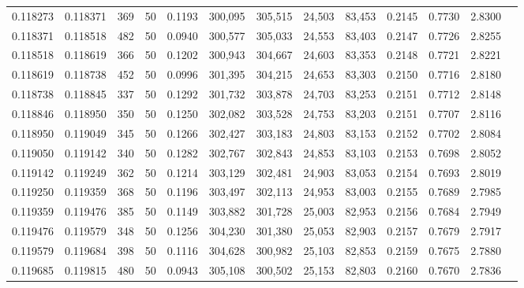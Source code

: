 \begin{tabular}{rrrrrrrrrrrrr}
0.118273 & 0.118371 &   369 &  50 &                                     0.1193 & 300,095 & 305,515 &  24,503 &  83,453 & 0.2145 & 0.7730 & 2.8300 \\
0.118371 & 0.118518 &   482 &  50 &                                     0.0940 & 300,577 & 305,033 &  24,553 &  83,403 & 0.2147 & 0.7726 & 2.8255 \\
0.118518 & 0.118619 &   366 &  50 &                                     0.1202 & 300,943 & 304,667 &  24,603 &  83,353 & 0.2148 & 0.7721 & 2.8221 \\
0.118619 & 0.118738 &   452 &  50 &                                     0.0996 & 301,395 & 304,215 &  24,653 &  83,303 & 0.2150 & 0.7716 & 2.8180 \\
0.118738 & 0.118845 &   337 &  50 &                                     0.1292 & 301,732 & 303,878 &  24,703 &  83,253 & 0.2151 & 0.7712 & 2.8148 \\
0.118846 & 0.118950 &   350 &  50 &                                     0.1250 & 302,082 & 303,528 &  24,753 &  83,203 & 0.2151 & 0.7707 & 2.8116 \\
0.118950 & 0.119049 &   345 &  50 &                                     0.1266 & 302,427 & 303,183 &  24,803 &  83,153 & 0.2152 & 0.7702 & 2.8084 \\
0.119050 & 0.119142 &   340 &  50 &                                     0.1282 & 302,767 & 302,843 &  24,853 &  83,103 & 0.2153 & 0.7698 & 2.8052 \\
0.119142 & 0.119249 &   362 &  50 &                                     0.1214 & 303,129 & 302,481 &  24,903 &  83,053 & 0.2154 & 0.7693 & 2.8019 \\
0.119250 & 0.119359 &   368 &  50 &                                     0.1196 & 303,497 & 302,113 &  24,953 &  83,003 & 0.2155 & 0.7689 & 2.7985 \\
0.119359 & 0.119476 &   385 &  50 &                                     0.1149 & 303,882 & 301,728 &  25,003 &  82,953 & 0.2156 & 0.7684 & 2.7949 \\
0.119476 & 0.119579 &   348 &  50 &                                     0.1256 & 304,230 & 301,380 &  25,053 &  82,903 & 0.2157 & 0.7679 & 2.7917 \\
0.119579 & 0.119684 &   398 &  50 &                                     0.1116 & 304,628 & 300,982 &  25,103 &  82,853 & 0.2159 & 0.7675 & 2.7880 \\
0.119685 & 0.119815 &   480 &  50 &                                     0.0943 & 305,108 & 300,502 &  25,153 &  82,803 & 0.2160 & 0.7670 & 2.7836 \\

\end{tabular}
